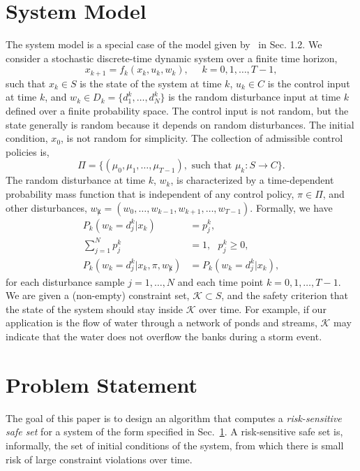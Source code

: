 \documentclass[letterpaper, 10 pt, conference]{ieeeconf}  %
\begin{document}
\section{System Model}\label{model}
The system model is a special case of the model given by~\cite{bertsekas2005dynamic} in Sec. 1.2.
We consider a stochastic discrete-time dynamic system over a finite time horizon,
\begin{equation}
x_{k+1} = f_k(x_k,u_k,w_k), \text{ }\text{ } k = 0, 1, \dots, T-1,
\label{sys}\end{equation}
such that $x_k \in S$ is the state of the system at time $k$,
$u_k \in C$ is the control input at time $k$, and
$w_k \in D_k = \{d_1^k,\dots,d_N^k\}$ is the random disturbance input at time $k$ defined over a finite probability space.
The control input is not random, but the state generally is random because it depends on random disturbances.
The initial condition, $x_0$, is not random for simplicity.
The collection of admissible control policies is,
\begin{equation}
\Pi = \{ (\mu_0, \mu_1, \dots, \mu_{T-1}), \text{ such that } \mu_k: S\rightarrow C \}.
\end{equation}
The random disturbance at time $k$, $w_k$, is characterized by a 
time-dependent probability mass function that is independent of any control policy, $\pi \in \Pi$, and other disturbances, $w_{\not k} = (w_0, \dots, w_{k-1}, w_{k+1}, \dots, w_{T-1})$.\footnotemark
{}
Formally, we have
\begin{equation}\begin{aligned}
P_k( w_k = d^k_j | x_k ) & = p_j^k, \\
\textstyle\sum_{j=1}^N p_j^k & = 1, \text{ } p_j^k \geq 0, \\
P_k( w_k = d^k_j | x_k, \pi, w_{\not k}) & = P_k( w_k = d^k_j | x_k ),
\end{aligned}\end{equation}
for each disturbance sample $j = 1,\dots,N$ and each time point $k = 0, 1, \dots, T-1$.
We are given a (non-empty) constraint set, $\mathcal{K} \subset S$, and the safety criterion that 
the state of the system should stay inside $\mathcal{K}$ over time.
For example, if our application is the flow of water through a network of ponds and streams, $\mathcal{K}$ may indicate that the water does not overflow the banks during a storm event.

\section{Problem Statement}
The goal of this paper is to design an algorithm that computes a \textit{risk-sensitive safe set} 
for a system of the form specified in Sec.~\ref{model}.
A risk-sensitive safe set is, informally, the set of initial conditions of the system, from which there is small risk of large constraint violations over time.
\end{document}
